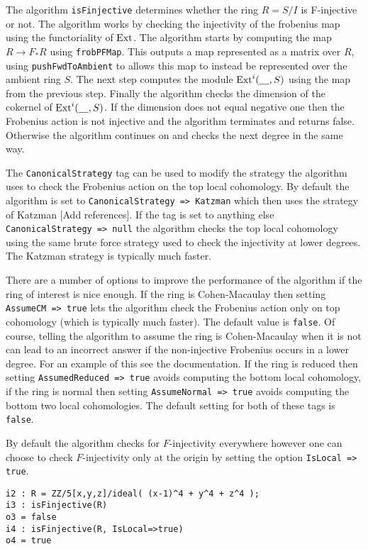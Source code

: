 \documentclass[11pt]{amsart}
\begin{document}
The algorithm {\tt isFinjective} determines whether the ring  $R = S/I$ is F-injective or not. The algorithm works by checking the injectivity of the frobenius map using the functoriality of $\operatorname{Ext}$.  The algorithm starts by computing  the map $R \rightarrow F_{*}R$ using {\tt frobPFMap}. This outputs a map represented as a matrix over $R$, using {\tt pushFwdToAmbient} to allows this map to instead be represented over the ambient ring $S$. The next step computes the module $\operatorname{Ext}^{i}( \underline{\hskip 10pt}, S)$ using the map from the previous step. Finally the algorithm checks the dimension of the cokernel of  $\operatorname{Ext}^{i}( \underline{\hskip 10pt}, S)$. If the dimension does not equal negative one then the Frobenius action is not injective and the algorithm terminates and returns false. Otherwise the algorithm continues on and checks the next degree in the same way.

The {\tt CanonicalStrategy} tag can be used to modify the strategy the algorithm uses to check the Frobenius action on the top local cohomology. By default the algorithm is set to {\tt CanonicalStrategy => Katzman} which then uses the strategy of Katzman  {\hfill\large\color{red} [Add references]}. If the tag is set to anything else {\tt CanonicalStrategy => null} the algorithm checks the top local cohomology using the same brute force strategy used to check the injectivity at lower degrees. The Katzman strategy is typically much faster.

There are a number of options to improve the performance of the algorithm if the ring of interest is nice enough. If the ring is Cohen-Macaulay then setting {\tt AssumeCM => true} lets the algorithm check the Frobenius action only on top cohomology (which is typically much faster).  The default value is {\tt false}. Of course, telling the algorithm to assume the ring is Cohen-Macaulay when it is not can lead to an incorrect answer if the non-injective Frobenius occurs in a lower degree. For an example of this see the documentation.  If the ring is reduced then setting {\tt AssumedReduced => true} avoids computing the bottom local cohomology, if the ring is normal then setting {\tt AssumeNormal => true} avoids computing the bottom two local cohomologies. The default setting for both of these tags is {\tt false}.

By default the algorithm checks for $F$-injectivity everywhere however one can choose to check $F$-injectivity only at the origin by setting the option {\tt IsLocal => true}.
\begin{verbatim}
i2 : R = ZZ/5[x,y,z]/ideal( (x-1)^4 + y^4 + z^4 );
i3 : isFinjective(R)
o3 = false
i4 : isFinjective(R, IsLocal=>true)
o4 = true
\end{verbatim}
\end{document}

